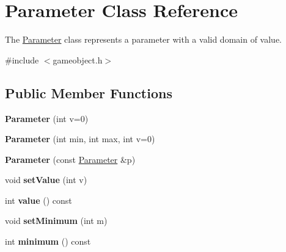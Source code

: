 \hypertarget{class_parameter}{\section{\-Parameter \-Class \-Reference}
\label{class_parameter}
}


\-The \hyperlink{class_parameter}{\-Parameter} class represents a parameter with a valid domain of value.  




{\ttfamily \#include $<$gameobject.\-h$>$}

\subsection*{\-Public \-Member \-Functions}
\begin{DoxyCompactItemize}
\item 
\hypertarget{class_parameter_aa6c9e61f1bb69049360de0d3eb87a365}{{\bfseries \-Parameter} (int v=0)}\label{class_parameter_aa6c9e61f1bb69049360de0d3eb87a365}

\item 
\hypertarget{class_parameter_a161c8aa0045e72afea7fe3bc3c1882c4}{{\bfseries \-Parameter} (int min, int max, int v=0)}\label{class_parameter_a161c8aa0045e72afea7fe3bc3c1882c4}

\item 
\hypertarget{class_parameter_ae0d97b30ba78d54dfa6b28b30ffbf847}{{\bfseries \-Parameter} (const \hyperlink{class_parameter}{\-Parameter} \&p)}\label{class_parameter_ae0d97b30ba78d54dfa6b28b30ffbf847}

\item 
\hypertarget{class_parameter_a5f4ec5f133fc90d0b20e83a063f5eb5c}{void {\bfseries set\-Value} (int v)}\label{class_parameter_a5f4ec5f133fc90d0b20e83a063f5eb5c}

\item 
\hypertarget{class_parameter_a971c0369e19300bf5f38124964203a65}{int {\bfseries value} () const }\label{class_parameter_a971c0369e19300bf5f38124964203a65}

\item 
\hypertarget{class_parameter_a8618a13484e3a4c6ef36cabe85bb6c23}{void {\bfseries set\-Minimum} (int m)}\label{class_parameter_a8618a13484e3a4c6ef36cabe85bb6c23}

\item 
\hypertarget{class_parameter_a181c5a830f3ee9c5a08eb62f7f678212}{int {\bfseries minimum} () const }\label{class_parameter_a181c5a830f3ee9c5a08eb62f7f678212}


\end{DoxyCompactItemize}
